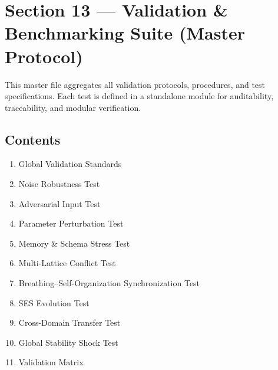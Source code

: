

\section*{Section 13 — Validation & Benchmarking Suite (Master Protocol)}

This master file aggregates all validation protocols, procedures, and test specifications.
Each test is defined in a standalone module for auditability, traceability, and modular verification.

\subsection*{Contents}
\begin{enumerate}
    \item Global Validation Standards
    \item Noise Robustness Test
    \item Adversarial Input Test
    \item Parameter Perturbation Test
    \item Memory & Schema Stress Test
    \item Multi-Lattice Conflict Test
    \item Breathing–Self-Organization Synchronization Test
    \item SES Evolution Test
    \item Cross-Domain Transfer Test
    \item Global Stability Shock Test
    \item Validation Matrix
\end{enumerate}












